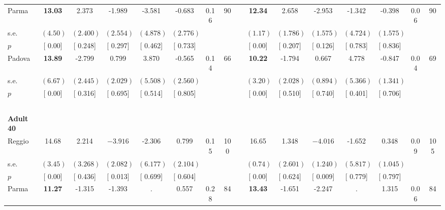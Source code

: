 \begin{longtable}{L{8em} c c c c c c c p{1em} c c c c c c c}
\quad \quad \quad Parma& \textbf{    13.03} &     2.373 &    -1.989 &    -3.581 &    -0.683 &      0.16 &        90 & & \textbf{    12.34} &     2.658 &    -2.953 &    -1.342 &    -0.398 &      0.06 &        90  \\*
\quad \quad \quad \quad s.e.& $ (     4.50)$ & $ (    2.400)$ & $ (    2.554)$ & $ (    4.878)$ & $ (    2.776)$ & & & & $ (     1.17)$ & $ (    1.786)$ & $ (    1.575)$ & $ (    4.724)$ & $ (    1.575)$ & &  \\*
\quad \quad \quad \quad $ p$ & [     0.00] & [    0.248] & [    0.297] & [    0.462] & [    0.733] & & & & [     0.00] & [    0.207] & [    0.126] & [    0.783] & [    0.836] & &  \\[1em]
\quad \quad \quad Padova& \textbf{    13.89} &    -2.799 &     0.799 &     3.870 &    -0.565 &      0.14 &        66 & & \textbf{    10.22} &    -1.794 &     0.667 &     4.778 &    -0.847 &      0.04 &        69  \\*
\quad \quad \quad \quad s.e.& $ (     6.67)$ & $ (    2.445)$ & $ (    2.029)$ & $ (    5.508)$ & $ (    2.560)$ & & & & $ (     3.20)$ & $ (    2.028)$ & $ (    0.894)$ & $ (    5.366)$ & $ (    1.341)$ & &  \\*
\quad \quad \quad \quad $ p$ & [     0.00] & [    0.316] & [    0.695] & [    0.514] & [    0.805] & & & & [     0.00] & [    0.510] & [    0.740] & [    0.401] & [    0.706] & &  \\[1em]
~\\[1em]
\quad \quad \textbf{Adult 40} & & & & & & & & & & & & & & & \\* 
\quad \quad \quad Reggio& 14.68 &     2.214 & $ \mathbf{   -3.916}$ &    -2.306 &     0.799 &      0.15 &       100 & & 16.65 &     1.348 & $ \mathbf{   -4.016}$ &    -1.652 &     0.348 &      0.09 &       105  \\*
\quad \quad \quad \quad s.e.& $ (     3.45)$ & $ (    3.268)$ & $ (    2.082)$ & $ (    6.177)$ & $ (    2.104)$ & & & & $ (     0.74)$ & $ (    2.601)$ & $ (    1.240)$ & $ (    5.817)$ & $ (    1.045)$ & &  \\*
\quad \quad \quad \quad $ p$ & [     0.00] & [    0.436] & [    0.013] & [    0.699] & [    0.604] & & & & [     0.00] & [    0.624] & [    0.009] & [    0.779] & [    0.797] & &  \\[1em]
\quad \quad \quad Parma& \textbf{    11.27} &    -1.315 &    -1.393 &         . &     0.557 &      0.28 &        84 & & \textbf{    13.43} &    -1.651 &    -2.247 &         . &     1.315 &      0.06 &        84  \\*

\end{longtable}
